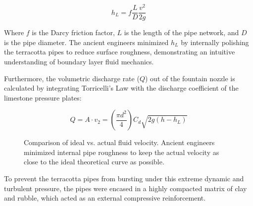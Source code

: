 \documentclass[12pt,a4paper]{report}
\begin{document}
	\begin{equation}
		h_L = f \frac{L}{D} \frac{v^2}{2g}
	\end{equation}
	
	Where $f$ is the Darcy friction factor, $L$ is the length of the pipe network, and $D$ is the pipe diameter. The ancient engineers minimized $h_L$ by internally polishing the terracotta pipes to reduce surface roughness, demonstrating an intuitive understanding of boundary layer fluid mechanics.
	
	Furthermore, the volumetric discharge rate ($Q$) out of the fountain nozzle is calculated by integrating Torricelli's Law with the discharge coefficient of the limestone pressure plates:
	
	\begin{equation}
		Q = A \cdot v_2 = \left(\frac{\pi d^2}{4}\right) C_d \sqrt{2g(h - h_L)}
	\end{equation}
	
	\begin{figure}[H]
		\centering
		\caption{Comparison of ideal vs. actual fluid velocity. Ancient engineers minimized internal pipe roughness to keep the actual velocity as close to the ideal theoretical curve as possible.}
		\label{fig:friction_velocity}
	\end{figure}
	
	To prevent the terracotta pipes from bursting under this extreme dynamic and turbulent pressure, the pipes were encased in a highly compacted matrix of clay and rubble, which acted as an external compressive reinforcement.
	
\end{document}
